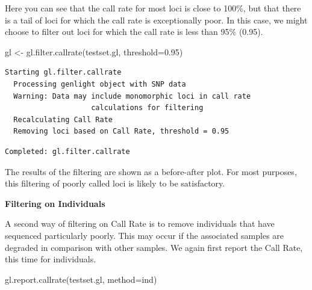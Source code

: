 \documentclass[
  letterpaper,
  DIV=11,
  numbers=noendperiod]{scrreprt}
\newenvironment{Shaded}{\begin{snugshade}}{\end{snugshade}}
\newcommand{\AttributeTok}[1]{\textcolor[rgb]{0.49,0.56,0.16}{#1}}
\newcommand{\FloatTok}[1]{\textcolor[rgb]{0.25,0.63,0.44}{#1}}
\newcommand{\FunctionTok}[1]{\textcolor[rgb]{0.02,0.16,0.49}{#1}}
\newcommand{\NormalTok}[1]{\textcolor[rgb]{0.00,0.44,0.13}{#1}}
\newcommand{\OtherTok}[1]{\textcolor[rgb]{0.00,0.44,0.13}{#1}}
\newcommand{\StringTok}[1]{\textcolor[rgb]{0.25,0.44,0.63}{#1}}
\let\textttOrig\texttt
\renewcommand{\texttt}[1]{\textttOrig{\color{blue}{#1}}}
\begin{document}
Here you can see that the call rate for most loci is close to 100\%, but
that there is a tail of loci for which the call rate is exceptionally
poor. In this case, we might choose to filter out loci for which the
call rate is less than 95\% (0.95).

\begin{Shaded}
\begin{Highlighting}[]
\NormalTok{gl }\OtherTok{\textless{}{-}} \FunctionTok{gl.filter.callrate}\NormalTok{(testset.gl, }\AttributeTok{threshold=}\FloatTok{0.95}\NormalTok{)}
\end{Highlighting}
\end{Shaded}

\begin{verbatim}
Starting gl.filter.callrate 
  Processing genlight object with SNP data
  Warning: Data may include monomorphic loci in call rate 
                    calculations for filtering
  Recalculating Call Rate
  Removing loci based on Call Rate, threshold = 0.95 
\end{verbatim}

\begin{figure}[H]

{\centering \texttt{[image: basicfiltering\_files/figure-pdf/unnamed-chunk-7-1.pdf]}

}

\end{figure}

\begin{verbatim}
Completed: gl.filter.callrate 
\end{verbatim}

The results of the filtering are shown as a before-after plot. For most
purposes, this filtering of poorly called loci is likely to be
satisfactory.

\textbf{Filtering on Individuals}

A second way of filtering on Call Rate is to remove individuals that
have sequenced particularly poorly. This may occur if the associated
samples are degraded in comparison with other samples. We again first
report the Call Rate, this time for individuals.

\begin{Shaded}
\begin{Highlighting}[]
\FunctionTok{gl.report.callrate}\NormalTok{(testset.gl, }\AttributeTok{method=}\StringTok{\textquotesingle{}ind\textquotesingle{}}\NormalTok{)}
\end{Highlighting}
\end{Shaded}
\end{document}
